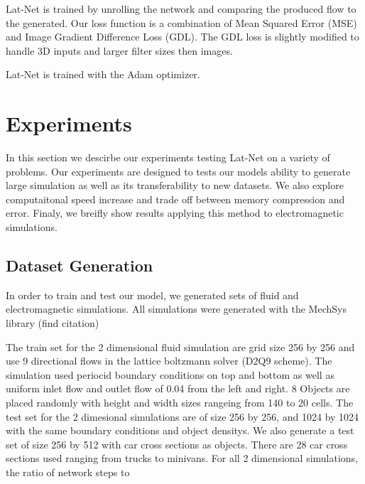 \documentclass{article}
\begin{document}
Lat-Net is trained by unrolling the network and comparing the produced flow to the generated. Our loss function is a combination of Mean Squared Error (MSE) and Image Gradient Difference Loss (GDL)\cite{mathieu2015deep}. The GDL loss is slightly modified to handle 3D inputs and larger filter sizes then images.


Lat-Net is trained with the Adam optimizer\cite{kingma2014adam}.

\section{Experiments}

In this section we descirbe our experiments testing Lat-Net on a variety of problems. Our experiments are designed to tests our models ability to generate large simulation as well as its transferability to new datasets. We also explore computaitonal speed increase and trade off between memory compression and error. Finaly, we breifly show results applying this method to electromagnetic simulations.

\subsection{Dataset Generation}
In order to train and test our model, we generated sets of fluid and electromagnetic simulations. All simulations were generated with the MechSys library (find citation)

The train set for the 2 dimensional fluid simulation are grid size 256 by 256 and use 9 directional flows in the lattice boltzmann solver (D2Q9 scheme)\cite{guo2013lattice}. The simulation used periocid boundary conditions on top and bottom as well as uniform inlet flow and outlet flow of 0.04 from the left and right. 8 Objects are placed randomly with height and width sizes rangeing from 140 to 20 cells. The test set for the 2 dimesional simulations are of size 256 by 256, and 1024 by 1024 with the same boundary conditions and object densitys. We also generate a test set of size 256 by 512 with car cross sections as objects. There are 28 car cross sections used ranging from trucks to minivans. For all 2 dimensional simulations, the ratio of network steps to 
\end{document}
